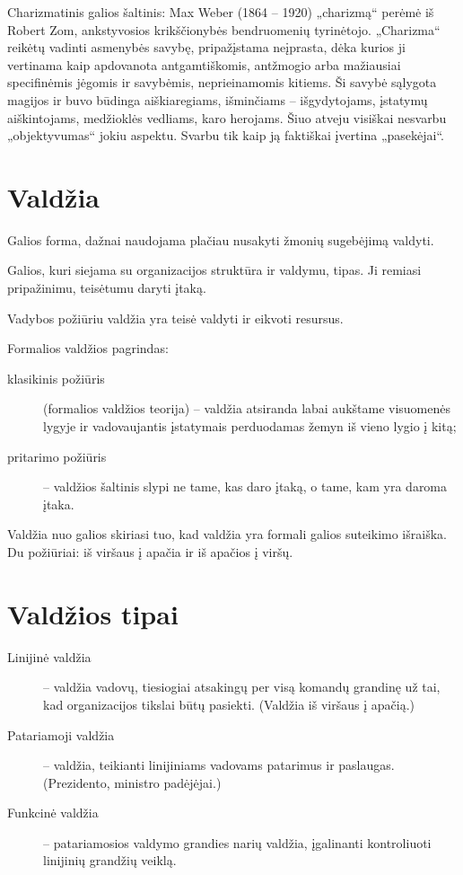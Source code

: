Charizmatinis galios šaltinis: Max Weber (1864 – 1920) „charizmą“ perėmė
iš Robert Zom, ankstyvosios krikščionybės bendruomenių tyrinėtojo.
„Charizma“ reikėtų vadinti asmenybės savybę, pripažįstama neįprasta,
dėka kurios ji vertinama kaip apdovanota antgamtiškomis, antžmogio
arba mažiausiai specifinėmis jėgomis ir savybėmis, neprieinamomis
kitiems. Ši savybė sąlygota magijos ir buvo būdinga aiškiaregiams,
išminčiams – išgydytojams, įstatymų aiškintojams, medžioklės vedliams,
karo herojams. Šiuo atveju visiškai nesvarbu „objektyvumas“ jokiu
aspektu. Svarbu tik kaip ją faktiškai įvertina „pasekėjai“.

\section{Valdžia}

\begin{defn}[Valdžia]
  Galios forma, dažnai naudojama plačiau nusakyti žmonių sugebėjimą
  valdyti.
\end{defn}

\begin{defn}
  Galios, kuri siejama su organizacijos struktūra ir valdymu, tipas.
  Ji remiasi pripažinimu, teisėtumu daryti įtaką.
\end{defn}

Vadybos požiūriu valdžia yra teisė valdyti ir eikvoti resursus.

Formalios valdžios pagrindas:
\begin{description}
  \item[klasikinis požiūris] (formalios valdžios teorija) – valdžia
    atsiranda labai aukštame visuomenės lygyje ir vadovaujantis
    įstatymais perduodamas žemyn iš vieno lygio į kitą;
  \item[pritarimo požiūris] – valdžios šaltinis slypi ne tame, kas
    daro įtaką, o tame, kam yra daroma įtaka.
\end{description}

Valdžia nuo galios skiriasi tuo, kad valdžia yra formali galios suteikimo
išraiška. Du požiūriai: iš viršaus į apačia ir iš apačios į viršų.

\section{Valdžios tipai}

\begin{description}
  \item[Linijinė valdžia] – valdžia vadovų, tiesiogiai atsakingų per
    visą komandų grandinę už tai, kad organizacijos tikslai būtų pasiekti.
    (Valdžia iš viršaus į apačią.)
  \item[Patariamoji valdžia] – valdžia, teikianti linijiniams vadovams
    patarimus ir paslaugas. (Prezidento, ministro padėjėjai.)
  \item[Funkcinė valdžia] – patariamosios valdymo grandies narių valdžia,
    įgalinanti kontroliuoti linijinių grandžių veiklą.
\end{description}

